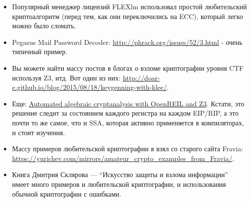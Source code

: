 \begin{itemize}

\item Популярный менеджер лицензий FLEXlm использовал простой любительский криптоалгоритм
(перед тем, как они переключились на \ac{ECC}), который легко можно было сломать.

\item Pegasus Mail Password Decoder: \url{http://phrack.org/issues/52/3.html} -
очень типичный пример.

\item Вы можете найти массу постов в блогах о взломе криптографии уровня \ac{CTF} используя Z3, итд.
Вот один из них: \url{http://doar-e.github.io/blog/2015/08/18/keygenning-with-klee/}.

\item Еще: \href{http://blog.cr4.sh/2015/03/automated-algebraic-cryptanalysis-with.html}{Automated algebraic cryptanalysis with OpenREIL and Z3}.
Кстати, это решение следит за состоянием каждого регистра на каждом EIP/RIP, а это почти то же самое, что и \ac{SSA},
которая активно применяется в компиляторах, и стоит изучения.

\item Массу примеров любительской криптографии я взял со старого сайта Fravia:
\url{https://yurichev.com/mirrors/amateur_crypto_examples_from_Fravia/}.

\item Книга Дмитрия Склярова --- ``Искусство защиты и взлома информации'' имеет много примеров и любительской криптографии,
и использования обычной криптографии с ошибками.

\end{itemize}


%

